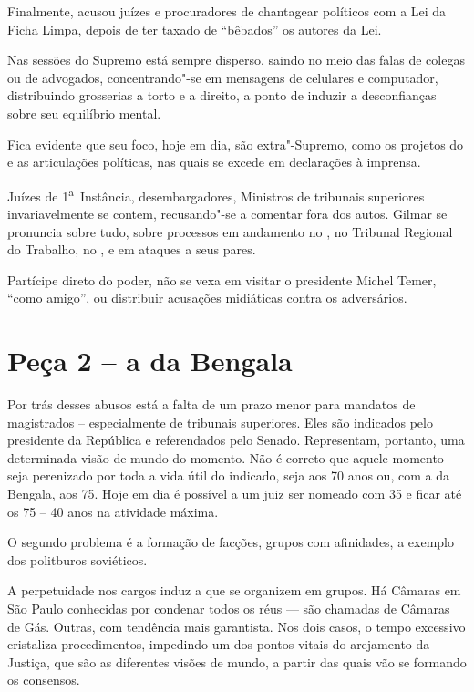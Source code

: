 Finalmente, acusou juízes e procuradores de chantagear políticos com a
Lei da Ficha Limpa, depois de ter taxado de ``bêbados'' os autores da
Lei.

Nas sessões do Supremo está sempre disperso, saindo no meio das falas de
colegas ou de advogados, concentrando"-se em mensagens de celulares e
computador, distribuindo grosserias a torto e a direito, a ponto de
induzir a desconfianças sobre seu equilíbrio mental.

Fica evidente que seu foco, hoje em dia, são extra"-Supremo, como os
projetos do  e as articulações políticas, nas quais se excede em
declarações à imprensa.

Juízes de 1\textsuperscript{a}~Instância, desembargadores, Ministros de
tribunais superiores invariavelmente se contem, recusando"-se a comentar
fora dos autos. Gilmar se pronuncia sobre tudo, sobre processos em
andamento no , no Tribunal Regional do Trabalho, no , e em ataques
a seus pares.

Partícipe direto do poder, não se vexa em visitar o presidente Michel
Temer, ``como amigo'', ou distribuir acusações midiáticas contra os
adversários.

\section{Peça 2 -- a  da Bengala}

Por trás desses abusos está a falta de um prazo menor para mandatos de
magistrados -- especialmente de tribunais superiores. Eles são indicados
pelo presidente da República e referendados pelo Senado. Representam,
portanto, uma determinada visão de mundo do momento. Não é correto que
aquele momento seja perenizado por toda a vida útil do indicado, seja
aos 70 anos ou, com a  da Bengala, aos 75. Hoje em dia é possível a
um juiz ser nomeado com 35 e ficar até os 75 -- 40 anos na atividade
máxima.

O segundo problema é a formação de facções, grupos com afinidades, a
exemplo dos politburos soviéticos.

A perpetuidade nos cargos induz a que se organizem em grupos. Há Câmaras
em São Paulo conhecidas por condenar todos os réus --- são chamadas de
Câmaras de Gás. Outras, com tendência mais garantista. Nos dois casos, o
tempo excessivo cristaliza procedimentos, impedindo um dos pontos vitais
do arejamento da Justiça, que são as diferentes visões de mundo, a
partir das quais vão se formando os consensos.

